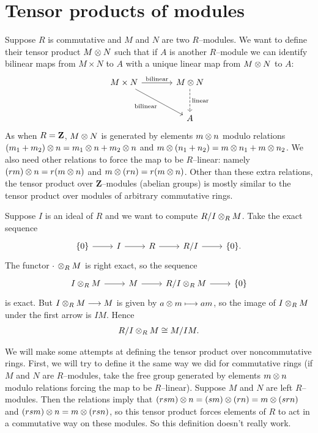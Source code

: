\documentclass[11pt, oneside,margin=1in]{article}
\begin{document}
\section{Tensor products of modules}
Suppose $R$ is commutative and $M$ and $N$ are two $R$--modules. We want to define their tensor product $M\otimes N$ such that if $A$ is another $R$--module we can identify bilinear maps from $M\times N$ to $A$ with a unique linear map from $M\otimes N$ to $A$:
\[
\begin{tikzcd}[sep = large]
	M\times N \arrow[r, "\textrm{bilinear}"] \arrow[dr, "\textrm{bilinear}", swap] & M\tensor N \arrow[d, "\textrm{linear}", dashed] \\  & A
\end{tikzcd}
\]
As when $R=\mathbf Z$, $M\otimes N$ is generated by elements $m\otimes n$ modulo relations $(m_1 +m_2) \otimes n = m_1\otimes n + m_2\otimes n$ and $m\otimes(n_1 + n_2) =m\otimes n_1 + m \otimes n_2$. We also need other relations to force the map to be $R$--linear: namely $(rm) \otimes n = r(m\otimes n)$ and $m\otimes (rn) = r (m\otimes n)$. Other than these extra relations, the tensor product over $\mathbf{Z}$--modules (abelian groups) is mostly similar to the tensor product over modules of arbitrary commutative rings.
\begin{example}[ ]\label{}
Suppose $I$ is an ideal of $R$ and we want to compute $R/I \otimes_R M$. Take the exact sequence
\[
\begin{tikzcd}
	\{0\} \arrow[r]&I \arrow[r]& R \arrow[r] & R/I \arrow[r] & \{0\}.
\end{tikzcd}
\]
The functor $\cdot\, \otimes_R M$ is right exact, so the sequence
\[
\begin{tikzcd}
	I\tensor_R M \arrow[r]& M \arrow[r] & R/I \tensor_R M \arrow[r] & \{0\}
\end{tikzcd}
\]
is exact. But $I\otimes_R M \longrightarrow M$ is given by $a\otimes m \longmapsto am$, so the image of $I\otimes_R M$ under the first arrow is $IM$. Hence \begin{align*}
	R/I\otimes_R M \cong M/IM.
\end{align*}
\end{example}

We will make some attempts at defining the tensor product over noncommutative rings. First, we will try to define it the same way we did for commutative rings (if $M$ and $N$ are $R$--modules, take the free group generated by elements $m\otimes n$ modulo relations forcing the map to be $R$--linear).
Suppose $M$ and $N$ are left $R$--modules. Then the relations imply that $(rsm) \otimes n =(sm)\otimes( rn) = m\otimes( srn)$ and $(rsm) \otimes n = m\otimes (rsn)$, so this tensor product forces elements of $R$ to act in a commutative way on these modules. So this definition doesn't really work. 
\end{document}
